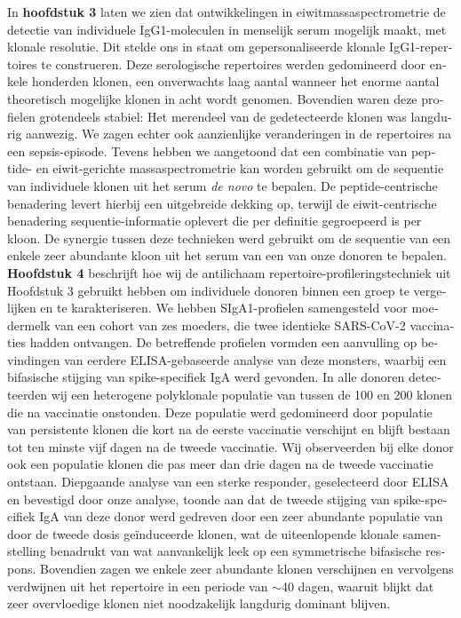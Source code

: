 \begin{otherlanguage}{dutch}
  In \textbf{hoofdstuk 3} laten we zien dat ontwikkelingen in eiwitmassaspectrometrie de detectie van individuele IgG1-moleculen in menselijk serum mogelijk maakt, met klonale resolutie. Dit stelde ons in staat om gepersonaliseerde klonale IgG1-repertoires te construeren. Deze serologische repertoires werden gedomineerd door enkele honderden klonen, een onverwachts laag aantal wanneer het enorme aantal theoretisch mogelijke klonen in acht wordt genomen. Bovendien waren deze profielen grotendeels stabiel: Het merendeel van de gedetecteerde klonen was langdurig aanwezig. We zagen echter ook aanzienlijke veranderingen in de repertoires na een sepsis-episode. Tevens hebben we aangetoond dat een combinatie van peptide- en eiwit-gerichte massaspectrometrie kan worden gebruikt om de sequentie van individuele klonen uit het serum \emph{de novo} te bepalen. De peptide-centrische benadering levert hierbij een uitgebreide dekking op, terwijl de eiwit-centrische benadering sequentie-informatie oplevert die per definitie gegroepeerd is per kloon. De synergie tussen deze technieken werd gebruikt om de sequentie van een enkele zeer abundante kloon uit het serum van een van onze donoren te bepalen.
  \bigskip\\
  \textbf{Hoofdstuk 4} beschrijft hoe wij de antilichaam repertoire-profileringstechniek uit Hoofdstuk 3 gebruikt hebben om individuele donoren binnen een groep te vergelijken en te karakteriseren. We hebben SIgA1-profielen samengesteld voor moedermelk van een cohort van zes moeders, die twee identieke SARS-CoV-2 vaccinaties hadden ontvangen. De betreffende profielen vormden een aanvulling op bevindingen van eerdere ELISA-gebaseerde analyse van deze monsters, waarbij een bifasische stijging van spike-specifiek IgA werd gevonden. In alle donoren detecteerden wij een heterogene polyklonale populatie van tussen de 100 en 200 klonen die na vaccinatie onstonden. Deze populatie werd gedomineerd door populatie van persistente klonen die kort na de eerste vaccinatie verschijnt en blijft bestaan tot ten minste vijf dagen na de tweede vaccinatie. Wij observeerden bij elke donor ook een populatie klonen die pas meer dan drie dagen na de tweede vaccinatie ontstaan. Diepgaande analyse van een sterke responder, geselecteerd door ELISA en bevestigd door onze analyse, toonde aan dat de tweede stijging van spike-specifiek IgA van deze donor werd gedreven door een zeer abundante populatie van door de tweede dosis geïnduceerde klonen, wat de uiteenlopende klonale samenstelling benadrukt van wat aanvankelijk leek op een symmetrische bifasische respons. Bovendien zagen we enkele zeer abundante klonen verschijnen en vervolgens verdwijnen uit het repertoire in een periode van $\sim$40 dagen, waaruit blijkt dat zeer overvloedige klonen niet noodzakelijk langdurig dominant blijven.

\end{otherlanguage}
